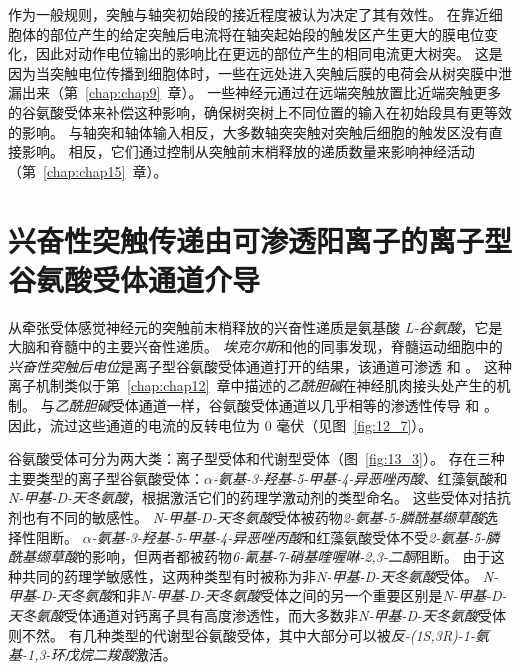 作为一般规则，突触与轴突初始段的接近程度被认为决定了其有效性。
在靠近细胞体的部位产生的给定突触后电流将在轴突起始段的触发区产生更大的膜电位变化，因此对动作电位输出的影响比在更远的部位产生的相同电流更大树突。
这是因为当突触电位传播到细胞体时，一些在远处进入突触后膜的电荷会从树突膜中泄漏出来（第~\ref{chap:chap9}~章）。
一些神经元通过在远端突触放置比近端突触更多的谷氨酸受体来补偿这种影响，确保树突树上不同位置的输入在初始段具有更等效的影响。
与轴突和轴体输入相反，大多数轴突突触对突触后细胞的触发区没有直接影响。
相反，它们通过控制从突触前末梢释放的递质数量来影响神经活动（第~\ref{chap:chap15}~章）。



\section{兴奋性突触传递由可渗透阳离子的离子型谷氨酸受体通道介导}

从牵张受体感觉神经元的突触前末梢释放的兴奋性递质是氨基酸 \textit{L-谷氨酸}，它是大脑和脊髓中的主要兴奋性递质。
\textit{埃克尔斯}和他的同事发现，脊髓运动细胞中的\textit{兴奋性突触后电位}是离子型谷氨酸受体通道打开的结果，该通道可渗透  和 。
这种离子机制类似于第~\ref{chap:chap12}~章中描述的\textit{乙酰胆碱}在神经肌肉接头处产生的机制。
与\textit{乙酰胆碱}受体通道一样，谷氨酸受体通道以几乎相等的渗透性传导  和 。
因此，流过这些通道的电流的反转电位为 0 毫伏（见图~\ref{fig:12_7}）。


谷氨酸受体可分为两大类：离子型受体和代谢型受体（图~\ref{fig:13_3}）。 
存在三种主要类型的离子型谷氨酸受体：\textit{$\alpha$-氨基-3-羟基-5-甲基-4-异恶唑丙酸}、红藻氨酸和\textit{N-甲基-D-天冬氨酸}，根据激活它们的药理学激动剂的类型命名。
这些受体对拮抗剂也有不同的敏感性。
\textit{N-甲基-D-天冬氨酸}受体被药物\textit{2-氨基-5-膦酰基缬草酸}选择性阻断。
\textit{$\alpha$-氨基-3-羟基-5-甲基-4-异恶唑丙酸}和红藻氨酸受体不受\textit{2-氨基-5-膦酰基缬草酸}的影响，但两者都被药物\textit{6-氰基-7-硝基喹喔啉-2,3-二酮}阻断。
由于这种共同的药理学敏感性，这两种类型有时被称为非\textit{N-甲基-D-天冬氨酸}受体。
\textit{N-甲基-D-天冬氨酸}和非\textit{N-甲基-D-天冬氨酸}受体之间的另一个重要区别是\textit{N-甲基-D-天冬氨酸}受体通道对钙离子具有高度渗透性，而大多数非\textit{N-甲基-D-天冬氨酸}受体则不然。
有几种类型的代谢型谷氨酸受体，其中大部分可以被\textit{反-(1S,3R)-1-氨基-1,3-环戊烷二羧酸}激活。


